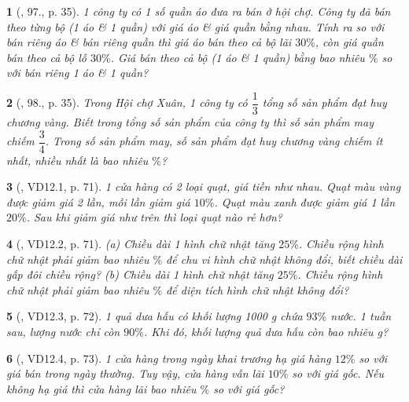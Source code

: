 \documentclass{article}
\newtheorem{baitoan}{}
\begin{document}
\begin{baitoan}[\cite{Binh_Toan_6_tap_2}, 97., p. 35]
	1 công ty có 1 số quần áo đưa ra bán ở hội chợ. Công ty đã bán theo từng bộ (1 áo \& 1 quần) với giá áo \& giá quần bằng nhau. Tính ra so với bán riêng áo \& bán riêng quần thì giá áo bán theo cả bộ lãi $30\%$, còn giá quần bán theo cả bộ lỗ $30\%$. Giá bán theo cả bộ (1 áo \& 1 quần) bằng bao nhiêu $\%$ so với bán riêng 1 áo \& 1 quần?
\end{baitoan}

\begin{baitoan}[\cite{Binh_Toan_6_tap_2}, 98., p. 35]
	Trong Hội chợ Xuân, 1 công ty có $\dfrac{1}{3}$ tổng số sản phẩm đạt huy chương vàng. Biết trong tổng số sản phẩm của công ty thì số sản phẩm may chiếm $\dfrac{3}{4}$. Trong số sản phẩm may, số sản phẩm đạt huy chương vàng chiếm ít nhất, nhiều nhất là bao nhiêu $\%$?
\end{baitoan}

\begin{baitoan}[\cite{TLCT_THCS_Toan_6_so_hoc}, VD12.1, p. 71]
	1 cửa hàng có 2 loại quạt, giá tiền như nhau. Quạt màu vàng được giảm giá 2 lần, mỗi lần giảm giá $10\%$. Quạt màu xanh được giảm giá 1 lần $20\%$. Sau khi giảm giá như trên thì loại quạt nào rẻ hơn?
\end{baitoan}

\begin{baitoan}[\cite{TLCT_THCS_Toan_6_so_hoc}, VD12.2, p. 71]
	(a) Chiều dài 1 hình chữ nhật tăng $25\%$. Chiều rộng hình chữ nhật phải giảm bao nhiêu $\%$ để chu vi hình chữ nhật không đổi, biết chiều dài gấp đôi chiều rộng? (b) Chiều dài 1 hình chữ nhật tăng $25\%$. Chiều rộng hình chữ nhật phải giảm bao nhiêu $\%$ để diện tích hình chữ nhật không đổi?
\end{baitoan}

\begin{baitoan}[\cite{TLCT_THCS_Toan_6_so_hoc}, VD12.3, p. 72]
	1 quả dưa hấu có khối lượng {\rm1000 g} chứa $93\%$ nước. 1 tuần sau, lượng nước chỉ còn $90\%$. Khi đó, khối lượng quả dưa hấu còn bao nhiêu {\rm g}?
\end{baitoan}

\begin{baitoan}[\cite{TLCT_THCS_Toan_6_so_hoc}, VD12.4, p. 73]
	1 cửa hàng trong ngày khai trương hạ giá hàng $12\%$ so với giá bán trong ngày thường. Tuy vậy, cửa hàng vẫn lãi $10\%$ so với giá gốc. Nếu không hạ giá thì cửa hàng lãi bao nhiêu $\%$ so với giá gốc?
\end{baitoan}
\end{document}
